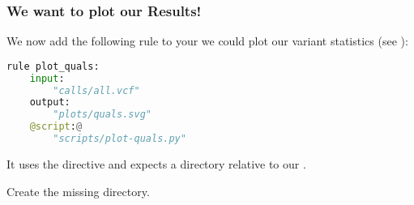 \begin{frame}[fragile]
  \frametitle{We want to plot our Results!}
  We now add the following rule to your  we could plot our variant statistics (see ):
  \begin{lstlisting}[language=Python,style=Python]
rule plot_quals:
    input:
        "calls/all.vcf"
    output:
        "plots/quals.svg"
    @script:@
        "scripts/plot-quals.py"
  \end{lstlisting}
  It uses the  directive and expects a directory  relative to our .
  \pause
  \begin{task}
  	Create the missing directory.
  \end{task}
\end{frame}

